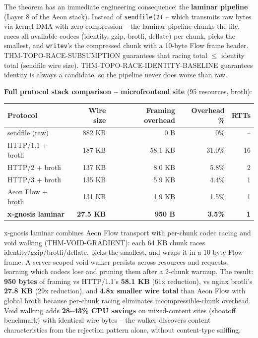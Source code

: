 \documentclass[
  11pt,
]{article}
\newcounter{none} %
\begin{document}
The theorem has an immediate engineering consequence: the
\textbf{laminar pipeline} (Layer 8 of the Aeon stack). Instead of
\texttt{sendfile(2)} -- which transmits raw bytes via kernel DMA with
zero compression -- the laminar pipeline chunks the file, races all
available codecs (identity, gzip, brotli, deflate) per chunk, picks the
smallest, and \texttt{writev}'s the compressed chunk with a 10-byte Flow
frame header. THM-TOPO-RACE-SUBSUMPTION guarantees that racing total
\(\leq\) identity total (sendfile wire size).
THM-TOPO-RACE-IDENTITY-BASELINE guarantees identity is always a
candidate, so the pipeline never does worse than raw.

\textbf{Full protocol stack comparison -- microfrontend site} (95
resources, brotli):

{\def\LTcaptype{none} %
\begin{longtable}[]{@{}lrrrr@{}}
\toprule\noalign{}
Protocol & Wire size & Framing overhead & Overhead \% & RTTs \\
\midrule\noalign{}
\endhead
\bottomrule\noalign{}
\endlastfoot
sendfile (raw) & 882 KB & 0 B & 0\% & -- \\
HTTP/1.1 + brotli & 187 KB & 58.1 KB & 31.0\% & 16 \\
HTTP/2 + brotli & 137 KB & 8.0 KB & 5.8\% & 2 \\
HTTP/3 + brotli & 135 KB & 5.9 KB & 4.4\% & 1 \\
Aeon Flow + brotli & 131 KB & 1.9 KB & 1.5\% & 1 \\
\textbf{x-gnosis laminar} & \textbf{27.5 KB} & \textbf{950 B} &
\textbf{3.5\%} & \textbf{1} \\
\end{longtable}
}

x-gnosis laminar combines Aeon Flow transport with per-chunk codec
racing and void walking (THM-VOID-GRADIENT): each 64 KB chunk races
identity/gzip/brotli/deflate, picks the smallest, and wraps it in a
10-byte Flow frame. A server-scoped void walker persists across
resources and requests, learning which codecs lose and pruning them
after a 2-chunk warmup. The result: \textbf{950 bytes} of framing vs
HTTP/1.1's \textbf{58.1 KB} (61x reduction), vs nginx brotli's
\textbf{27.8 KB} (29x reduction), and \textbf{4.8x smaller wire total}
than Aeon Flow with global brotli because per-chunk racing eliminates
incompressible-chunk overhead. Void walking adds \textbf{28--43\% CPU
savings} on mixed-content sites (shootoff benchmark) with identical wire
bytes -- the walker discovers content characteristics from the rejection
pattern alone, without content-type sniffing.
\end{document}
